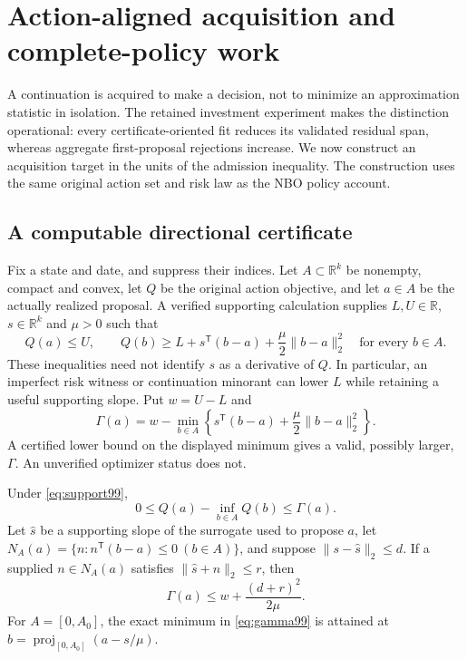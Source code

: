 \section{Action-aligned acquisition and complete-policy work}\label{sec:action99}
A continuation is acquired to make a decision, not to minimize an approximation statistic in isolation. The retained investment experiment makes the distinction operational: every certificate-oriented fit reduces its validated residual span, whereas aggregate first-proposal rejections increase. We now construct an acquisition target in the units of the admission inequality. The construction uses the same original action set and risk law as the NBO policy account.

\subsection{A computable directional certificate}
Fix a state and date, and suppress their indices. Let $A\subset\mathbb R^k$ be nonempty, compact and convex, let $Q$ be the original action objective, and let $a\in A$ be the actually realized proposal. A verified supporting calculation supplies $L,U\in\mathbb R$, $s\in\mathbb R^k$ and $\mu>0$ such that
\begin{equation}\label{eq:support99}
 Q(a)\le U,\qquad
 Q(b)\ge L+s^{\mathsf T}(b-a)+\frac\mu2\|b-a\|_2^2
 \quad\text{for every }b\in A.
\end{equation}
These inequalities need not identify $s$ as a derivative of $Q$. In particular, an imperfect risk witness or continuation minorant can lower $L$ while retaining a useful supporting slope. Put $w=U-L$ and
\begin{equation}\label{eq:gamma99}
 \Gamma(a)=w-\min_{b\in A}
       \left\{s^{\mathsf T}(b-a)+\frac\mu2\|b-a\|_2^2\right\}.
\end{equation}
A certified lower bound on the displayed minimum gives a valid, possibly larger, $\Gamma$. An unverified optimizer status does not.

\begin{theorem}\label{thm:action99}
Under \eqref{eq:support99},
\[
 0\le Q(a)-\inf_{b\in A}Q(b)\le\Gamma(a).
\]
Let $\widehat s$ be a supporting slope of the surrogate used to propose $a$, let $N_A(a)=\{n:n^{\mathsf T}(b-a)\le0\ (b\in A)\}$, and suppose
$\|s-\widehat s\|_2\le d$. If a supplied $n\in N_A(a)$ satisfies
$\|\widehat s+n\|_2\le r$, then
\begin{equation}\label{eq:direction99}
 \Gamma(a)\le w+\frac{(d+r)^2}{2\mu}.
\end{equation}
For $A=[0,A_0]$, the exact minimum in \eqref{eq:gamma99} is attained at
$b=\operatorname{proj}_{[0,A_0]}(a-s/\mu)$.
\end{theorem}

